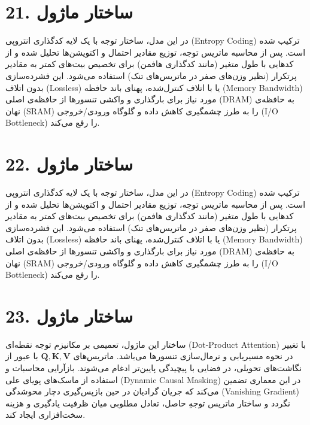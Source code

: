 \documentclass[12pt,a4paper]{report}
\begin{document}
\section*{21. ساختار ماژول }
در این مدل، ساختار توجه با یک لایه کدگذاری انتروپی (Entropy Coding) ترکیب شده است. پس از محاسبه ماتریس توجه، توزیع مقادیر احتمال و اکتویشن‌ها تحلیل شده و از کدهایی با طول متغیر (مانند کدگذاری هافمن) برای تخصیص بیت‌های کمتر به مقادیر پرتکرار (نظیر وزن‌های صفر در ماتریس‌های تنک) استفاده می‌شود. این فشرده‌سازی بدون اتلاف (Lossless) یا با اتلاف کنترل‌شده، پهنای باند حافظه (Memory Bandwidth) مورد نیاز برای بارگذاری و واکشی تنسورها از حافظه‌ی اصلی (DRAM) به حافظه‌ی نهان (SRAM) را به طرز چشمگیری کاهش داده و گلوگاه ورودی/خروجی (I/O Bottleneck) را رفع می‌کند.

\section*{22. ساختار ماژول }
در این مدل، ساختار توجه با یک لایه کدگذاری انتروپی (Entropy Coding) ترکیب شده است. پس از محاسبه ماتریس توجه، توزیع مقادیر احتمال و اکتویشن‌ها تحلیل شده و از کدهایی با طول متغیر (مانند کدگذاری هافمن) برای تخصیص بیت‌های کمتر به مقادیر پرتکرار (نظیر وزن‌های صفر در ماتریس‌های تنک) استفاده می‌شود. این فشرده‌سازی بدون اتلاف (Lossless) یا با اتلاف کنترل‌شده، پهنای باند حافظه (Memory Bandwidth) مورد نیاز برای بارگذاری و واکشی تنسورها از حافظه‌ی اصلی (DRAM) به حافظه‌ی نهان (SRAM) را به طرز چشمگیری کاهش داده و گلوگاه ورودی/خروجی (I/O Bottleneck) را رفع می‌کند.

\section*{23. ساختار ماژول }
ساختار این ماژول، تعمیمی بر مکانیزم توجه نقطه‌ای (Dot-Product Attention) با تغییر در نحوه مسیریابی و نرمال‌سازی تنسورها می‌باشد. ماتریس‌های $\mathbf{Q, K, V}$ با عبور از نگاشت‌های تحویلی، در فضایی با پیچیدگی پایین‌تر ادغام می‌شوند. بازآرایی محاسبات و استفاده از ماسک‌های پویای علی (Dynamic Causal Masking) در این معماری تضمین می‌کند که جریان گرادیان در حین بازپس‌گیری دچار محوشدگی (Vanishing Gradient) نگردد و ساختار ماتریس توجهِ حاصل، تعادل مطلوبی میان ظرفیت یادگیری و هزینه سخت‌افزاری ایجاد کند.
\end{document}
